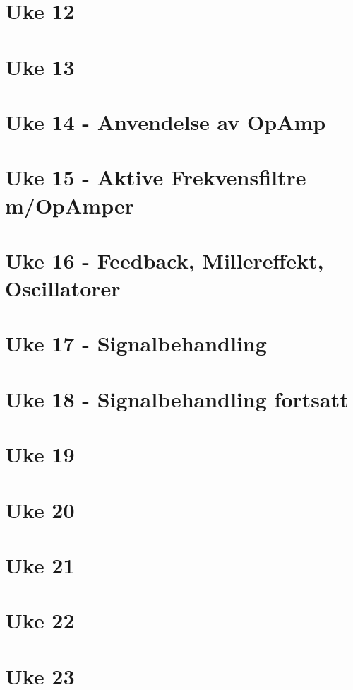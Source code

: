 \documentclass{article}
\begin{document}
  \section{Uke 12}
    
  \section{Uke 13}
    
  \section{Uke 14 - Anvendelse av OpAmp}
    
  \section{Uke 15 - Aktive Frekvensfiltre m/OpAmper}
    
  \section{Uke 16 - Feedback, Millereffekt, Oscillatorer}
    
  \section{Uke 17 - Signalbehandling}
    
  \section{Uke 18 - Signalbehandling fortsatt}
    
  \section{Uke 19}
  \section{Uke 20}
  \section{Uke 21}
  \section{Uke 22}
  \section{Uke 23}
\end{document}
